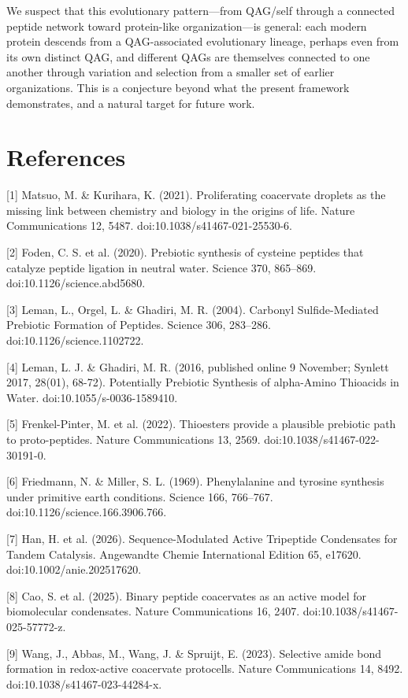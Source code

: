 \documentclass[11pt]{article}
\begin{document}
We suspect that this evolutionary pattern---from QAG/self through a connected peptide network toward protein-like organization---is general: each modern protein descends from a QAG-associated evolutionary lineage, perhaps even from its own distinct QAG, and different QAGs are themselves connected to one another through variation and selection from a smaller set of earlier organizations. This is a conjecture beyond what the present framework demonstrates, and a natural target for future work.

\hypertarget{references}{%
\section*{References}\label{references}}

{[}1{]} Matsuo, M. \& Kurihara, K. (2021). Proliferating coacervate droplets as the missing link between chemistry and biology in the origins of life. Nature Communications 12, 5487. doi:10.1038/s41467-021-25530-6.

{[}2{]} Foden, C. S. et al. (2020). Prebiotic synthesis of cysteine peptides that catalyze peptide ligation in neutral water. Science 370, 865--869. doi:10.1126/science.abd5680.

{[}3{]} Leman, L., Orgel, L. \& Ghadiri, M. R. (2004). Carbonyl Sulfide-Mediated Prebiotic Formation of Peptides. Science 306, 283--286. doi:10.1126/science.1102722.

{[}4{]} Leman, L. J. \& Ghadiri, M. R. (2016, published online 9 November; Synlett 2017, 28(01), 68-72). Potentially Prebiotic Synthesis of alpha-Amino Thioacids in Water. doi:10.1055/s-0036-1589410.

{[}5{]} Frenkel-Pinter, M. et al. (2022). Thioesters provide a plausible prebiotic path to proto-peptides. Nature Communications 13, 2569. doi:10.1038/s41467-022-30191-0.

{[}6{]} Friedmann, N. \& Miller, S. L. (1969). Phenylalanine and tyrosine synthesis under primitive earth conditions. Science 166, 766--767. doi:10.1126/science.166.3906.766.

{[}7{]} Han, H. et al. (2026). Sequence-Modulated Active Tripeptide Condensates for Tandem Catalysis. Angewandte Chemie International Edition 65, e17620. doi:10.1002/anie.202517620.

{[}8{]} Cao, S. et al. (2025). Binary peptide coacervates as an active model for biomolecular condensates. Nature Communications 16, 2407. doi:10.1038/s41467-025-57772-z.

{[}9{]} Wang, J., Abbas, M., Wang, J. \& Spruijt, E. (2023). Selective amide bond formation in redox-active coacervate protocells. Nature Communications 14, 8492. doi:10.1038/s41467-023-44284-x.
\end{document}
